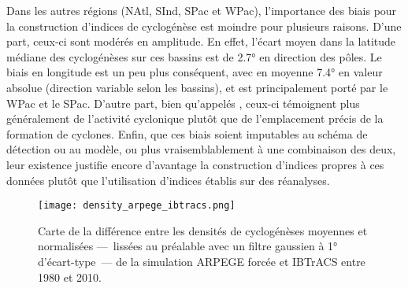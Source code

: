 \documentclass[../main.tex]{subfiles}
\begin{document}
Dans les autres régions (NAtl, SInd, SPac et WPac), l'importance des biais pour la construction d'indices de cyclogénèse est moindre pour plusieurs raisons.
D'une part, ceux-ci sont modérés en amplitude. En effet, l'écart moyen dans la latitude médiane des cyclogénèses sur ces bassins est de \ang{2.7} en direction
des pôles. Le biais en longitude est un peu plus conséquent, avec en moyenne \ang{7.4} en valeur absolue (direction variable selon les bassins), et est
principalement porté par le WPac et le SPac. D'autre part, bien qu'appelés , ceux-ci témoignent plus généralement de
l'activité cyclonique plutôt que de l'emplacement précis de la formation de cyclones. Enfin, que ces biais soient imputables au schéma de détection ou au
modèle, ou plus vraisemblablement à une combinaison des deux, leur existence justifie encore d'avantage la construction d'indices propres à ces données plutôt
que l'utilisation d'indices établis sur des réanalyses.

\begin{figure}[tb]
    \centering
    \texttt{[image: density\_arpege\_ibtracs.png]}
    \caption{Carte de la différence entre les densités de cyclogénèses moyennes et normalisées ---~lissées au préalable avec un filtre gaussien à \ang{1}
    d'écart-type~--- de la simulation ARPEGE forcée et IBTrACS entre \num{1980} et \num{2010}.}
    \label{fig:density_arpege_ibtracs}
\end{figure}


\end{document}
